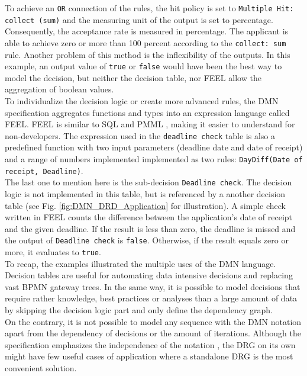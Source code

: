 To achieve an \texttt{OR} connection of the rules, the hit policy is set to \texttt{Multiple Hit: collect (sum)} and the measuring unit of the output is set to percentage. Consequently, the acceptance rate is measured in percentage. The applicant is able to achieve zero or more than 100 percent according to the \texttt{collect: sum} rule. Another problem of this method is the inflexibility of the outputs. In this example, an output value of \texttt{true} or \texttt{false} would have been the best way to model the decision, but neither the decision table, nor \acl{FEEL} allow the aggregation of boolean values. \\
To individualize the decision logic or create more advanced rules, the DMN specification aggregates functions and types into an expression language called \ac{FEEL}. \newpage
FEEL is similar to \ac{SQL} and \ac{PMML} \cite{DMNspec2016}, making it easier to understand for non-developers. The expression used in the \texttt{deadline check} table is also a predefined function with two input parameters (deadline date and date of receipt) and a range of numbers implemented implemented as two rules: \texttt{DayDiff(Date of receipt, Deadline)}. \\
The last one to mention here is the sub-decision \texttt{Deadline check}. The decision logic is not implemented in this table, but is referenced by a another decision table (see Fig. \ref{fig:DMN_DRD_Application} for illustration). A simple check written in \ac{FEEL} counts the difference between the application's date of receipt and the given deadline. If the result is less than zero, the deadline is missed and the output of \texttt{Deadline check} is \texttt{false}. Otherwise, if the result equals zero or more, it evaluates to \texttt{true}. \\

To recap, the examples illustrated the multiple uses of the DMN language. Decision tables are useful for automating data intensive decisions and replacing vast BPMN gateway trees. In the same way, it is possible to model decisions that require rather knowledge, best practices or analyses than a large amount of data by skipping the decision logic part and only define the dependency graph. \\
On the contrary, it is not possible to model any sequence with the DMN notation apart from the dependency of decisions or the amount of iterations. Although the specification emphasizes the independence of the notation \cite{DMNspec2016}, the \ac{DRG} on its own might have few useful cases of application where a standalone \ac{DRG} is the most convenient solution. \\

